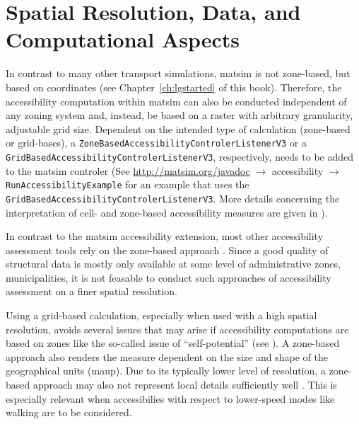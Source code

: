 
\section{Spatial Resolution, Data, and Computational Aspects}
In contrast to many other transport simulations, \gls{matsim} is not zone-based, but based on coordinates (see 
Chapter~\ref{ch:lgstarted} of this book).
Therefore, the accessibility computation within \gls{matsim} can also be conducted independent 
of any zoning system and, instead, be based on a raster with arbitrary granularity, \ie adjustable grid
size. Dependent on the intended type of calculation (zone-based or grid-bases), a 
\lstinline{ZoneBasedAccessibilityControlerListenerV3} or a 
\lstinline{GridBasedAccessibilityControlerListenerV3}, respectively, needs to be added to the \gls{matsim} controler 
(See \url{http://matsim.org/javadoc} $\to$ accessibility $\to$ \lstinline{RunAccessibilityExample} for an example
that uses the \lstinline{GridBasedAccessibilityControlerListenerV3}. More details concerning the interpretation
of cell- and zone-based accessibility measures are given in \citet{NicolaiNagel2012HiResAccessibilityMethodInBook}).

In contrast to the \gls{matsim} accessibility extension, most other accessibility assessment tools
rely on the zone-based approach 
\citep{CurtisEtAl2013AccessibilityPolicyInnovation, LiuZhu2004AccessibilityAnalyst, BuettnerEtAl2010Erreichbarkeitsatlas}.
Since a good quality of structural data is mostly only available at some level of administrative zones, 
\eg municipalities, it is not feasable to conduct such approaches of accessibility assessment on a finer 
spatial resolution.

Using a grid-based calculation, especially when used with a high spatial resolution, avoids several issues
that may arise if accessibility computations are based on zones like the so-called issue of ``self-potential''
(see \citep[e.g.,][]{NicolaiNagel2012HiResAccessibilityMethodInBook}). A zone-based approach also renders the 
measure dependent on the size and shape of the geographical units (\cf \gls{maup}). 
Due to its typically lower level of resolution, a zone-based approach may also
not represent local details sufficiently well \citep{Kwan1998PointBasedAccessibility}. This is especially relevant
when accessibilies with respect to lower-speed modes like walking are to be considered.

